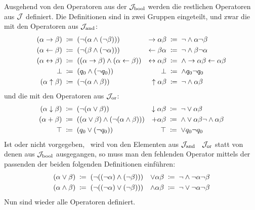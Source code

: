 Ausgehend von den Operatoren aus der  $\mathcal{J}_{\mathrm{bool}}$ werden die restlichen Operatoren aus $\mathcal{J}$ definiert. Die Definitionen sind in zwei Gruppen eingeteilt, und zwar die mit den Operatoren aus $\mathcal{J}_{\mathrm{and}}$:
\begin{align}
	(\alpha \rightarrow \beta) &\;\coloneqq\; (\lnot (\alpha \land  (\lnot \beta))) &
	\rightarrow \alpha \beta   &\;\coloneqq\;  \lnot    \land \alpha \lnot \beta
	\label{def:imp}
	\\
	(\alpha \leftarrow \beta) &\;\coloneqq\; (\lnot (\beta \land  (\lnot \alpha))) &
	\leftarrow \beta  \alpha  &\;\coloneqq\;  \lnot    \land \beta \lnot \alpha
	\label{def:rep}
	\\
	(\alpha\leftrightarrow\beta) &\;\coloneqq\;((\alpha\rightarrow\beta)\land(\alpha\leftarrow\beta))&
	\leftrightarrow\alpha \beta  &\;\coloneqq\;\land \rightarrow \alpha \beta \leftarrow \alpha \beta
	\label{def:equiv}
	\\
	\bot              &\;\coloneqq\; (q_0 \land (\lnot q_0)) &
	\bot              &\;\coloneqq\;  \land q_0  \lnot q_0   \label{def:false}
	\\
	(\alpha \uparrow \beta)&\;\coloneqq\; (\lnot (\alpha \land \beta )) &
	\uparrow \alpha  \beta &\;\coloneqq\;  \lnot  \land \alpha \beta \label{def:nand}
\end{align}
und die mit den Operatoren aus $\mathcal{J}_{\mathrm{or}}$:
\begin{align}
	(\alpha \downarrow \beta) &\;\coloneqq\; (\lnot (\alpha \lor \beta))   &
	\downarrow \alpha  \beta  & \;\coloneqq\;  \lnot  \lor \alpha \beta \label{def:nor}
	\\
	(\alpha+\beta)&\;\coloneqq\;((\alpha\lor\beta)\land(\lnot(\alpha\land\beta)))&
	+\alpha \beta &\;\coloneqq\;  \land \lor\alpha\beta \lnot \land\alpha\beta
	\label{def:add}
	\\
	\top & \;\coloneqq\; (q_0 \lor (\lnot q_0)) &
	\top & \;\coloneqq\;  \lor q_0  \lnot q_0
	\label{def:true}
\end{align}
%
Ist \symqt{\lor} oder \symqt{\land} nicht vorgegeben, \textdh\ wird von den Elementen aus $\mathcal{J}_{\mathrm{and}}$ \textbzgl\ $\mathcal{J}_{\mathrm{or}}$ statt von denen aus $\mathcal{J}_{\mathrm{bool}}$ ausgegangen, so muss man den fehlenden Operator mittels der passenden der beiden folgenden Definitionen einführen:
\begin{align}
	(\alpha \lor \beta)  & \;\coloneqq\; (\lnot((\lnot\alpha)\land(\lnot\beta))) &
	\lor \alpha  \beta   & \;\coloneqq\;  \lnot \land \lnot \alpha \lnot \beta
	\label{def:orand} \\
	(\alpha \land \beta) & \;\coloneqq\; (\lnot((\lnot\alpha)\lor(\lnot\beta)))  &
	\land \alpha  \beta  & \;\coloneqq\;  \lnot \lor \lnot \alpha \lnot \beta
	\label{def:andor}
\end{align}
Nun sind wieder alle Operatoren definiert.

